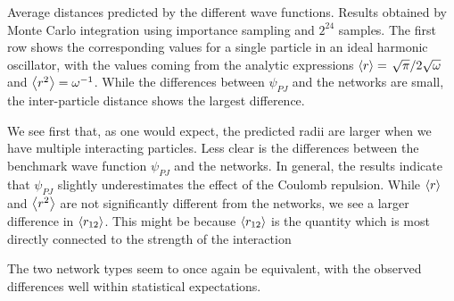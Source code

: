 \documentclass[Thesis.tex]{subfiles}
\begin{document}
\begin{table}[h]
  \centering
  \caption{Average distances predicted by the different wave functions. Results
    obtained by Monte Carlo integration using importance sampling and $2^{24}$
    samples. The first row shows the corresponding values for a single particle
    in an ideal harmonic oscillator, with the values coming from the analytic
    expressions $\expval{r}=\flatfrac{\sqrt\pi}{2\sqrt\omega}$ and
    $\expval{r^2}=\omega^{-1}$. While the differences between $\psi_{PJ}$ and
    the networks are small, the inter-particle distance shows the largest
    difference.}
  
  \label{tab:QD-mean-distance-metrics}
\end{table}
We see first that, as one would expect, the predicted radii are larger when we
have multiple interacting particles. Less clear is the differences between the
benchmark wave function $\psi_{PJ}$ and the networks. In general, the results
indicate that $\psi_{PJ}$ slightly underestimates the effect of the Coulomb
repulsion. While $\expval{r}$ and $\expval{r^2}$ are not significantly different
from the networks, we see a larger difference in $\expval{r_{12}}$. This might
be because $\expval{r_{12}}$ is the quantity which is most directly
connected to the strength of the interaction 

The two network types seem to once again be equivalent, with the observed differences well
within statistical expectations.
\end{document}
